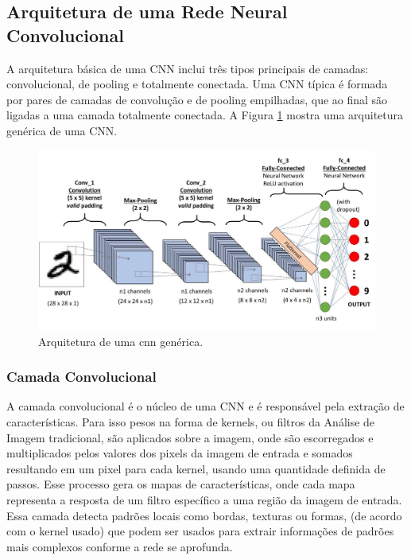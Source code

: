 \subsection{Arquitetura de uma Rede Neural Convolucional}

A arquitetura básica de uma CNN inclui três tipos principais de camadas: convolucional, de pooling e totalmente conectada. Uma CNN típica é formada por pares de camadas de convolução e de pooling empilhadas, que ao final são ligadas a uma camada totalmente conectada.
A Figura \ref{fig:cnn_arch} mostra uma arquitetura genérica de uma CNN. 

\begin{figure}[htb]
\centerline{\includegraphics[width=1\linewidth]{images/cnn_placeholder.jpg}}
\caption{Arquitetura de uma \acrshort{cnn} genérica.}
\label{fig:cnn_arch}
\end{figure}

\subsubsection{Camada Convolucional}

A camada convolucional é o núcleo de uma CNN e é responsável pela extração de características. 
Para isso pesos na forma de kernels, ou filtros da Análise de Imagem tradicional, 
são aplicados sobre a imagem, onde são escorregados e multiplicados pelos valores dos pixels da imagem de entrada e somados resultando em um pixel para cada kernel, 
usando uma quantidade definida de passos. Esse processo gera os mapas de características, onde cada mapa representa a resposta de um filtro específico a uma região da imagem de entrada. 
Essa camada detecta padrões locais como bordas, texturas ou formas, (de acordo com o kernel usado) que podem ser usados para extrair informações de padrões mais complexos conforme a rede se aprofunda.


